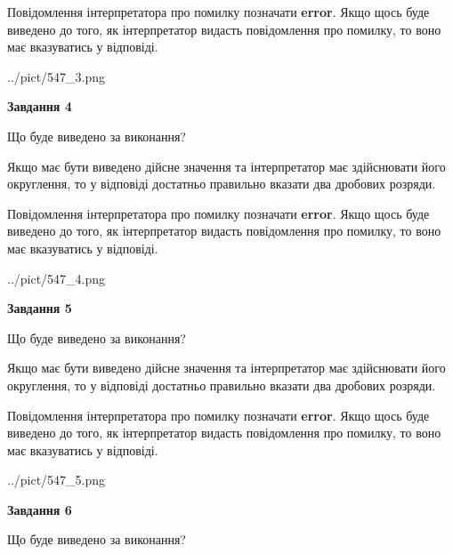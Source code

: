 \documentclass[12pt, ukrainian]{article}
\begin{document}
{\begin {Large}
Повідомлення інтерпретатора про помилку позначати \textbf{error}.
Якщо щось буде виведено до того, як інтерпретатор видасть повідомлення про помилку, 
то воно має вказуватись у відповіді. \par

\begin{center}
	{../pict/547_3.png}
\end{center}
\newpage

{\begin {center}\textbf{Завдання 4}\end {center}}\par
Що буде виведено за виконання? \par

Якщо має бути виведено дійсне значення та інтерпретатор має здійснювати його округлення, 
то у відповіді достатньо правильно вказати два дробових розряди.

Повідомлення інтерпретатора про помилку позначати \textbf{error}.
Якщо щось буде виведено до того, як інтерпретатор видасть повідомлення про помилку, 
то воно має вказуватись у відповіді. \par

\begin{center}
	{../pict/547_4.png}
\end{center}
\newpage

{\begin {center}\textbf{Завдання 5}\end {center}}\par
Що буде виведено за виконання? \par

Якщо має бути виведено дійсне значення та інтерпретатор має здійснювати його округлення, 
то у відповіді достатньо правильно вказати два дробових розряди.

Повідомлення інтерпретатора про помилку позначати \textbf{error}.
Якщо щось буде виведено до того, як інтерпретатор видасть повідомлення про помилку, 
то воно має вказуватись у відповіді. \par

\begin{center}
	{../pict/547_5.png}
\end{center}
\newpage

{\begin {center}\textbf{Завдання 6}\end {center}}\par
Що буде виведено за виконання? \par


\end{Large}}
\end{document}
